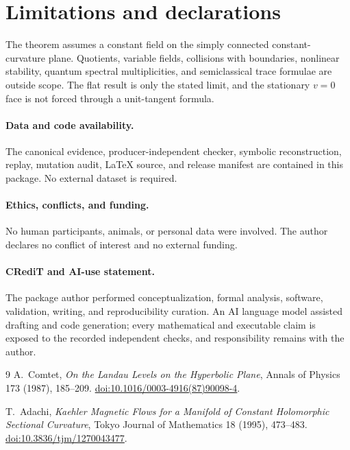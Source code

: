 \documentclass[10pt]{article}
\begin{document}
\section{Limitations and declarations}
The theorem assumes a constant field on the simply connected constant-
curvature plane.  Quotients, variable fields, collisions with boundaries,
nonlinear stability, quantum spectral multiplicities, and semiclassical trace
formulae are outside scope.  The flat result is only the stated limit, and the
stationary $v=0$ face is not forced through a unit-tangent formula.

\paragraph{Data and code availability.}
The canonical evidence, producer-independent checker, symbolic reconstruction,
replay, mutation audit, LaTeX source, and release manifest are contained in
this package.  No external dataset is required.

\paragraph{Ethics, conflicts, and funding.}
No human participants, animals, or personal data were involved.  The author
declares no conflict of interest and no external funding.

\paragraph{CRediT and AI-use statement.}
The package author performed conceptualization, formal analysis, software,
validation, writing, and reproducibility curation.  An AI language model
assisted drafting and code generation; every mathematical and executable
claim is exposed to the recorded independent checks, and responsibility
remains with the author.
\fi

\begin{thebibliography}{9}
A.~Comtet, \emph{On the Landau Levels on the Hyperbolic Plane}, Annals of
Physics 173 (1987), 185--209.
\href{https://doi.org/10.1016/0003-4916(87)90098-4}{doi:10.1016/0003-4916(87)90098-4}.

T.~Adachi, \emph{Kaehler Magnetic Flows for a Manifold of Constant
Holomorphic Sectional Curvature}, Tokyo Journal of Mathematics 18 (1995),
473--483.
\href{https://doi.org/10.3836/tjm/1270043477}{doi:10.3836/tjm/1270043477}.
\end{thebibliography}
\end{document}
